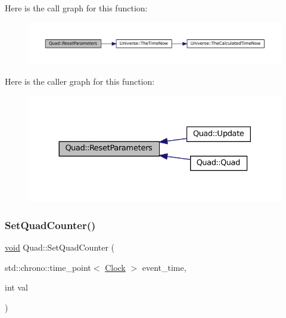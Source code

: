 Here is the call graph for this function\+:\nopagebreak
\begin{figure}[H]
\begin{center}
\leavevmode
\includegraphics[width=350pt]{class_quad_af7c18022d7db1ad20bb7a1e1bd1ffb90_cgraph}
\end{center}
\end{figure}
Here is the caller graph for this function\+:\nopagebreak
\begin{figure}[H]
\begin{center}
\leavevmode
\includegraphics[width=330pt]{class_quad_af7c18022d7db1ad20bb7a1e1bd1ffb90_icgraph}
\end{center}
\end{figure}
\mbox{\label{class_quad_a66ba58a32cf7b351e3e155efbdb46f8e}} 
\subsubsection{\texorpdfstring{Set\+Quad\+Counter()}{SetQuadCounter()}}
{\footnotesize\ttfamily \mbox{\hyperlink{glad_8h_a950fc91edb4504f62f1c577bf4727c29}{void}} Quad\+::\+Set\+Quad\+Counter (\begin{DoxyParamCaption}\item[{std\+::chrono\+::time\+\_\+point$<$ \mbox{\hyperlink{universe_8h_a0ef8d951d1ca5ab3cfaf7ab4c7a6fd80}{Clock}} $>$}]{event\+\_\+time,  }\item[{int}]{val }\end{DoxyParamCaption})\hspace{0.3cm}{\ttfamily [inline]}}




